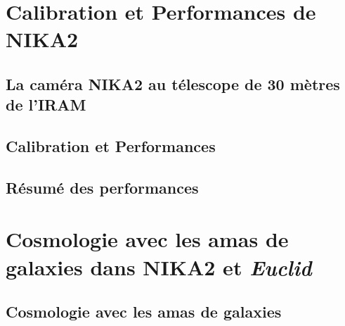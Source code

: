 \documentclass[a4paper, 12pt]{report}
\begin{document}
\part{Calibration et Performances de NIKA2}
%
%   
%
\chapter{La caméra NIKA2 au télescope de 30 mètres de l'IRAM}
\label{chap:nika2iram}

%
%   
%
\chapter{Calibration et Performances}
\label{chap:calib_perf}


%
%   
%
\chapter{Résumé des performances}
\label{chap:nika2_resume}


%
%
%
%
%
%
%

\part{Cosmologie avec les amas de galaxies dans NIKA2 et \emph{Euclid}}

%
%
\chapter{Cosmologie avec les amas de galaxies}
\label{se:cosmo_general}

\end{document}
